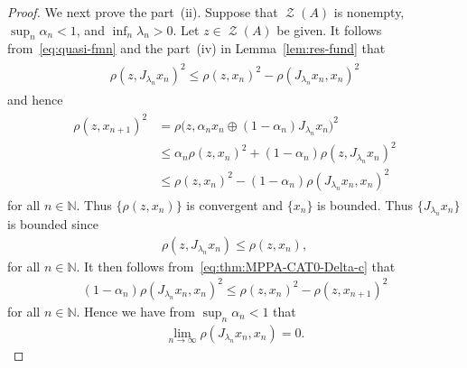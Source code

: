 \documentclass[draft]{amsart}
\numberwithin{equation}{section}
\def\N{\mathbb N}
\DeclareMathOperator{\Zer}{\mathcal{Z}}
\theoremstyle{plain}
\theoremstyle{definition}
\theoremstyle{remark}
\begin{document}
\begin{proof}
 We next prove the part~(ii). Suppose that $\Zer (A)$ is nonempty, $\sup_n \alpha_n <1$, 
 and $\inf_n \lambda_n >0$. Let $z\in \Zer (A)$ be given. 
 It follows from~\eqref{eq:quasi-fmn} and the part~(iv) in Lemma~\ref{lem:res-fund} that 
 \begin{align*}
  \begin{split}
   \rho(z, J_{\lambda_n}x_n)^2 
   \leq \rho(z, x_n)^2 - \rho(J_{\lambda_n}x_n, x_n)^2
  \end{split}
 \end{align*}
 and hence 
 \begin{align}
  \begin{split}\label{eq:thm:MPPA-CAT0-Delta-c}
   \rho(z, x_{n+1})^2 
   &=\rho\bigl(z, \alpha_n x_n \oplus (1-\alpha_n) J_{\lambda_n}x_n\bigr)^2 \\
   &\leq  \alpha_n \rho(z, x_n)^2 + (1-\alpha_n)\rho(z, J_{\lambda_n}x_n)^2 \\
   &\leq  \rho(z, x_n)^2 - (1-\alpha_n)\rho(J_{\lambda_n}x_n, x_n)^2 
  \end{split}
 \end{align}
 for all $n\in \N$. Thus $\{\rho(z, x_n)\}$ is convergent and $\{x_n\}$ is bounded. 
 Thus $\{J_{\lambda_n}x_n\}$ is bounded since 
 \begin{align*}
  \rho(z, J_{\lambda_n}x_n)\leq \rho(z, x_n), 
 \end{align*}
 for all $n\in \N$. 
 It then follows from~\eqref{eq:thm:MPPA-CAT0-Delta-c} that 
 \begin{align*}
  (1-\alpha_n) \rho(J_{\lambda_n}x_n, x_n)^2 
  \leq \rho(z, x_n)^2 - \rho(z, x_{n+1})^2
 \end{align*}
 for all $n\in \N$. Hence we have from $\sup_n \alpha_n <1$ that 
 \begin{align}\label{eq:thm:MPPA-CAT0-Delta-d}
  \lim_{n\to \infty}\rho(J_{\lambda_n}x_n, x_n) =0. 
 \end{align}


\end{proof}
\end{document}
